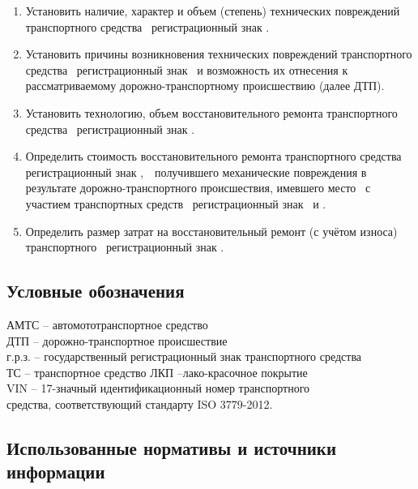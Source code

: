 \begin{enumerate}
\item  Установить наличие, характер и объем (степень) технических повреждений транспортного средства  \tc\, регистрационный знак .
\item  Установить причины возникновения технических повреждений транспортного средства \, регистрационный знак \, и возможность их отнесения к рассматриваемому дорожно-транспортному происшествию (далее ДТП).
\item  Установить технологию, объем восстановительного  ремонта транспортного средства \tc\, регистрационный знак .
\item  Определить стоимость восстановительного ремонта  транспортного средства \tc\, регистрационный знак ,\, \, получившего механические повреждения в результате дорожно-транспортного происшествия, имевшего место \, с участием транспортных средств \, регистрационный знак \, и \tcb.
\item Определить размер затрат на восстановительный ремонт (с учётом износа) транспортного  \, регистрационный знак .
\end{enumerate}
\subsection{Условные обозначения}

\noindent АМТС – автомототранспортное средство\\
ДТП – дорожно-транспортное происшествие\\
г.р.з. – государственный регистрационный знак транспортного средства\\
ТС – транспортное средство
ЛКП –лако-красочное покрытие\\
VIN – 17-значный идентификационный номер транспортного\\ средства, соответствующий стандарту ISO 3779-2012. 


\subsection{Использованные нормативы и источники информации}

